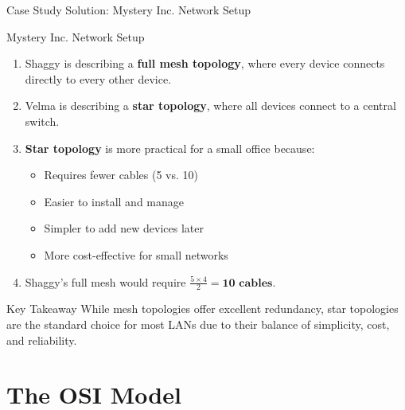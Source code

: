 \documentclass[aspectratio=169]{beamer}  %
\begin{document}
\begin{frame}{Case Study Solution: Mystery Inc. Network Setup}
    \begin{casesolution}{Mystery Inc. Network Setup}
        \begin{enumerate}
            \item Shaggy is describing a \textbf{full mesh topology}, where every device connects directly to every other device.
            \item Velma is describing a \textbf{star topology}, where all devices connect to a central switch.
            \item \textbf{Star topology} is more practical for a small office because:
                \begin{itemize}
                    \item Requires fewer cables (5 vs. 10)
                    \item Easier to install and manage
                    \item Simpler to add new devices later
                    \item More cost-effective for small networks
                \end{itemize}
            \item Shaggy's full mesh would require $\frac{5 \times 4}{2} = \textbf{10 cables}$.
        \end{enumerate}
    \end{casesolution}
    
    \begin{alertblock}{Key Takeaway}
        While mesh topologies offer excellent redundancy, star topologies are the standard choice for most LANs due to their balance of simplicity, cost, and reliability.
    \end{alertblock}
\end{frame}

\section{The OSI Model}

\end{document}
